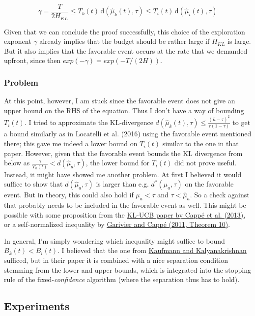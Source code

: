 \documentclass[12pt,]{article}
\newcommand{\der}{\,\text{d}}
\begin{document}
\[
\gamma = \frac{T}{2H_{KL}} \leq T_k(t) \der(\hat{\mu}_k(t), \tau) \leq T_i(t) \der(\hat{\mu}_i(t), \tau) 
\]

Given that we can conclude the proof successfully, this choice of the
exploration exponent \(\gamma\) already implies that the budget should
be rather large if \(H_{KL}\) is large. But it also implies that the
favorable event occurs at the rate that we demanded upfront, since then
\(exp(-\gamma) = exp(-T/(2H))\).

\subsubsection{Problem}\label{problem}

At this point, however, I am stuck since the favorable event does not
give an upper bound on the RHS of the equation. Thus I don't have a way
of bounding \(T_i(t)\). I tried to approximate the KL-divergence
\(d(\hat{\mu}_k(t), \tau) \leq \frac{(\hat{\mu}-\tau)^2}{\tau(1-\tau)}\)
to get a bound similarly as in Locatelli et al. (2016) using the
favorable event mentioned there; this gave me indeed a lower bound on
\(T_i(t)\) similar to the one in that paper. However, given that the
favorable event bounds the KL divergence from below as
\(\frac{\gamma}{T_a(t)} < d(\hat{\mu}_a, \tau)\), the lower bound for
\(T_i(t)\) did not prove useful. Instead, it might have showed me
another problem. At first I believed it would suffice to show that
\(d(\hat{\mu}_a, \tau)\) is larger than e.g. \(d^*(\mu_a, \tau)\) on the
favorable event. But in theory, this could also hold if \(\mu_a < \tau\)
and \(\tau < \hat{\mu}_a\). So a check against that probably needs to be
included in the favorable event as well. This might be possible with
some proposition from the
\href{https://projecteuclid.org/download/pdfview_1/euclid.aos/1375362558}{KL-UCB
paper by Cappé et al. (2013)}, or a self-normalized inequality by
\href{https://arxiv.org/pdf/1102.2490.pdf}{Garivier and Cappé (2011,
Theorem 10)}.

In general, I'm simply wondering which inequality might suffice to bound
\(B_k(t) < B_i(t)\). I believed that the one from
\href{http://proceedings.mlr.press/v30/Kaufmann13.pdf}{Kaufmann and
Kalyanakrishnan} sufficed, but in their paper it is combined with a nice
separation condition stemming from the lower and upper bounds, which is
integrated into the stopping rule of the fixed-\emph{confidence}
algorithm (where the separation thus has to hold).

\subsection{Experiments}\label{experiments}
\end{document}

